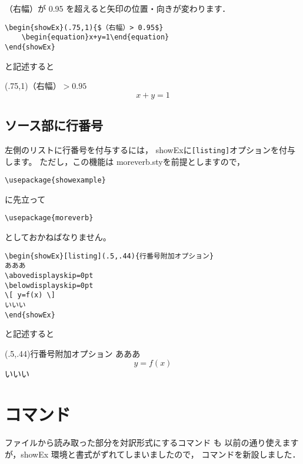 \documentclass{jarticle}
\begin{document}
（右幅）が 0.95 を超えると矢印の位置・向きが変わります．
\begin{dblbox}
\begin{verbatim}
\begin{showEx}(.75,1){$（右幅）> 0.95$}
    \begin{equation}x+y=1\end{equation}
\end{showEx}
\end{verbatim}
\end{dblbox}
と記述すると
\begin{showEx}(.75,1){$（右幅）> 0.95$}
    \begin{equation}x+y=1\end{equation}
\end{showEx}

\subsection{ソース部に行番号}
左側のリストに行番号を付与するには，
\textsf{showEx}に\verb+[listing]+オプションを付与します。
ただし，この機能は \textsf{moreverb.sty}を前提としますので，
\begin{jquote}
\begin{verbatim}
\usepackage{showexample}
\end{verbatim}
\end{jquote}
に先立って
\begin{jquote}
\begin{verbatim}
\usepackage{moreverb}
\end{verbatim}
\end{jquote}
としておかねばなりません。

\begin{dblbox}
\begin{verbatim}
\begin{showEx}[listing](.5,.44){行番号附加オプション}
あああ
\abovedisplayskip=0pt
\belowdisplayskip=0pt
\[ y=f(x) \]
いいい
\end{showEx}
\end{verbatim}
\end{dblbox}
と記述すると

\begin{showEx}[listing](.5,.44){行番号附加オプション}
あああ
\abovedisplayskip=0pt
\belowdisplayskip=0pt
\[ y=f(x) \]
いいい
\end{showEx}

\clearpage

\section{コマンド}
ファイルから読み取った部分を対訳形式にするコマンド  も
以前の通り使えますが，\textsf{showEx} 環境と書式がずれてしまいましたので，
 コマンドを新設しました．
\end{document}
